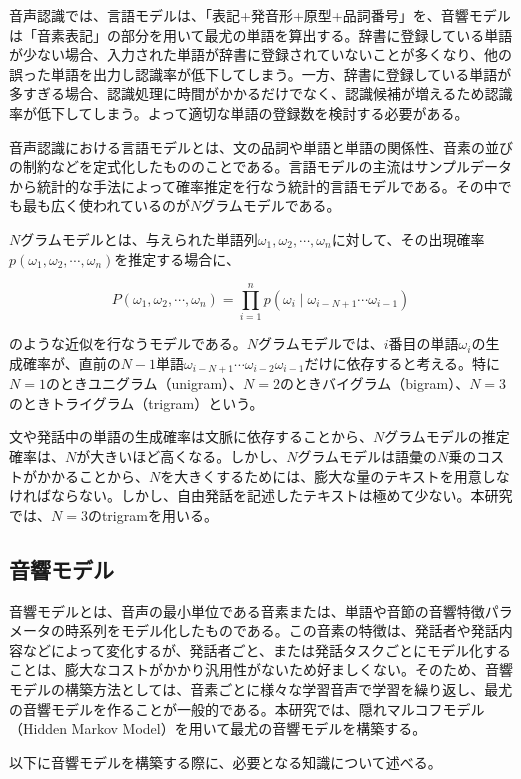 音声認識では、言語モデルは、「表記+発音形+原型+品詞番号」を、音響モデルは「音素表記」の部分を用いて最尤の単語を算出する。辞書に登録している単語が少ない場合、入力された単語が辞書に登録されていないことが多くなり、他の誤った単語を出力し認識率が低下してしまう。一方、辞書に登録している単語が多すぎる場合、認識処理に時間がかかるだけでなく、認識候補が増えるため認識率が低下してしまう。よって適切な単語の登録数を検討する必要がある。\vspace{0.2in}

\par
音声認識における言語モデルとは、文の品詞や単語と単語の関係性、音素の並びの制約などを定式化したもののことである。言語モデルの主流はサンプルデータから統計的な手法によって確率推定を行なう統計的言語モデルである。その中でも最も広く使われているのが$N$グラムモデルである。\vspace{0.2in}

\par
$N$グラムモデルとは、与えられた単語列$\omega_1,\omega_2,\cdots,\omega_n$に対して、その出現確率$p(\omega_1,\omega_2,\cdots,\omega_n)$を推定する場合に、

\begin{equation}
P(\omega_1,\omega_2,\cdots,\omega_n)=\prod_{i=1}^{n}p(\omega_{i}\mid \omega_{i-N+1}\cdots \omega_{i-1})
\end{equation}

のような近似を行なうモデルである。$N$グラムモデルでは、$i$番目の単語$ω_i$の生成確率が、直前の$N-1$単語$ω_{i-N+1}\cdots ω_{i-2}ω_{i-1}$だけに依存すると考える。特に$N = 1$のときユニグラム（unigram）、$N = 2$のときバイグラム（bigram）、$N = 3$のときトライグラム（trigram）という。\par
文や発話中の単語の生成確率は文脈に依存することから、$N$グラムモデルの推定確率は、$N$が大きいほど高くなる。しかし、$N$グラムモデルは語彙の$N$乗のコストがかかることから、$N$を大きくするためには、膨大な量のテキストを用意しなければならない。しかし、自由発話を記述したテキストは極めて少ない。本研究では、$N = 3$のtrigramを用いる。\par



\subsection{音響モデル}
\label{acoustic_model}
音響モデルとは、音声の最小単位である音素または、単語や音節の音響特徴パラメータの時系列をモデル化したものである。この音素の特徴は、発話者や発話内容などによって変化するが、発話者ごと、または発話タスクごとにモデル化することは、膨大なコストがかかり汎用性がないため好ましくない。そのため、音響モデルの構築方法としては、音素ごとに様々な学習音声で学習を繰り返し、最尤の音響モデルを作ることが一般的である。本研究では、隠れマルコフモデル（Hidden Markov Model）を用いて最尤の音響モデルを構築する。\par
以下に音響モデルを構築する際に、必要となる知識について述べる。\vspace{0.2in}

